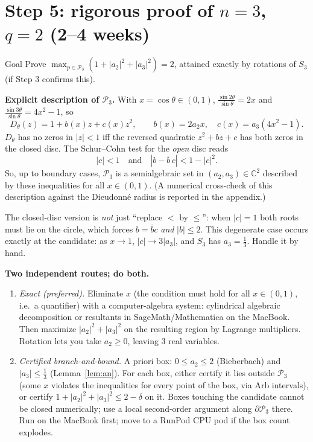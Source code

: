 \documentclass[11pt]{article}
\newcommand{\C}{\mathbb{C}}
\begin{document}
\section{Step 5: rigorous proof of $n=3$, $q=2$ (2--4 weeks)}

\begin{goal}{Goal}
Prove $\max_{p\in\mathcal P_3}(1+|a_2|^2+|a_3|^2)=2$, attained exactly by rotations of $S_3$ (if Step 3 confirms this).
\end{goal}

\textbf{Explicit description of $\mathcal P_3$.} With $x=\cos\theta\in(0,1)$, $\frac{\sin2\theta}{\sin\theta}=2x$ and $\frac{\sin3\theta}{\sin\theta}=4x^2-1$, so
\[
D_\theta(z)=1+b(x)z+c(x)z^2,\qquad b(x)=2a_2x,\quad c(x)=a_3(4x^2-1).
\]
$D_\theta$ has no zeros in $|z|<1$ iff the reversed quadratic $z^2+b z+c$ has both zeros in the closed disc. The Schur--Cohn test for the \emph{open} disc reads
\[
|c|<1\quad\text{and}\quad|b-\bar b\,c|<1-|c|^2 .
\]
So, up to boundary cases, $\mathcal P_3$ is a semialgebraic set in $(a_2,a_3)\in\C^2$ described by these inequalities for all $x\in(0,1)$. (A numerical cross-check of this description against the Dieudonné radius is reported in the appendix.)

\begin{pitfall}
The closed-disc version is \emph{not} just ``replace $<$ by $\le$'': when $|c|=1$ both roots must lie on the circle, which forces $b=\bar b c$ \emph{and} $|b|\le2$. This degenerate case occurs exactly at the candidate: as $x\to1$, $|c|\to3|a_3|$, and $S_3$ has $a_3=\tfrac13$. Handle it by hand.
\end{pitfall}

\textbf{Two independent routes; do both.}
\begin{enumerate}[leftmargin=*]
\item \emph{Exact (preferred).} Eliminate $x$ (the condition must hold for all $x\in(0,1)$, i.e.\ a quantifier) with a computer-algebra system: cylindrical algebraic decomposition or resultants in SageMath/Mathematica on the MacBook. Then maximize $|a_2|^2+|a_3|^2$ on the resulting region by Lagrange multipliers. Rotation lets you take $a_2\ge0$, leaving 3 real variables.
\item \emph{Certified branch-and-bound.} A priori box: $0\le a_2\le2$ (Bieberbach) and $|a_3|\le\tfrac13$ (Lemma~\ref{lem:an}). For each box, either certify it lies outside $\mathcal P_3$ (some $x$ violates the inequalities for every point of the box, via Arb intervals), or certify $1+|a_2|^2+|a_3|^2\le 2-\delta$ on it. Boxes touching the candidate cannot be closed numerically; use a local second-order argument along $\partial\mathcal P_3$ there. Run on the MacBook first; move to a RunPod CPU pod if the box count explodes.
\end{enumerate}
\end{document}
